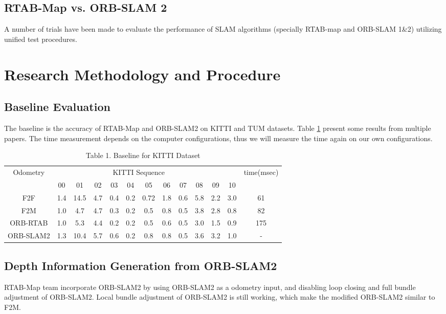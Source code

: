 \documentclass[12pt]{article}
\begin{document}
\subsection{RTAB-Map vs. ORB-SLAM 2}
A number of trials have been made to evaluate the performance of SLAM algorithms (specially RTAB-map and ORB-SLAM 1\&2)  utilizing unified test procedures. 

\section{Research Methodology and Procedure}
\subsection{Baseline Evaluation}
The baseline is the accuracy of RTAB-Map and ORB-SLAM2 on KITTI and TUM datasets. Table \ref{tab:my-table} present some results from multiple papers. The time measurement depends on the computer configurations, thus we will measure the time again on our own configurations. 
\begin{table}[]
    \centering
    \begin{tabular}{@{}ccccccccccccc@{}}
    \toprule
    Odometry  & \multicolumn{10}{c}{KITTI Sequence}                         &     & time(msec)   \\
              & 00  & 01   & 02  & 03  & 04  & 05   & 06  & 07  & 08  & 09  & 10  &     \\ \midrule
    F2F       & 1.4 & 14.5 & 4.7 & 0.4 & 0.2 & 0.72 & 1.8 & 0.6 & 5.8 & 2.2 & 3.0 & 61  \\ \midrule
    F2M       & 1.0 & 4.7  & 4.7 & 0.3 & 0.2 & 0.5  & 0.8 & 0.5 & 3.8 & 2.8 & 0.8 & 82  \\ \midrule
    ORB-RTAB  & 1.0 & 5.3  & 4.4 & 0.2 & 0.2 & 0.5  & 0.6 & 0.5 & 3.0 & 1.5 & 0.9 & 175 \\ \midrule
    ORB-SLAM2 & 1.3 & 10.4 & 5.7 & 0.6 & 0.2 & 0.8  & 0.8 & 0.5 & 3.6 & 3.2 & 1.0 & -   \\ \bottomrule
    \end{tabular}
    \caption{Table 1. Baseline for KITTI Dataset}
    \label{tab:my-table}
    \end{table}

\subsection{Depth Information Generation from ORB-SLAM2}
RTAB-Map team incorporate ORB-SLAM2 by using ORB-SLAM2 as a odometry input, and disabling loop closing and full bundle adjustment of ORB-SLAM2\cite{labbe2019rtab}. Local bundle adjustment of ORB-SLAM2 is still working, which make the modified ORB-SLAM2 similar to F2M. 
\end{document}
